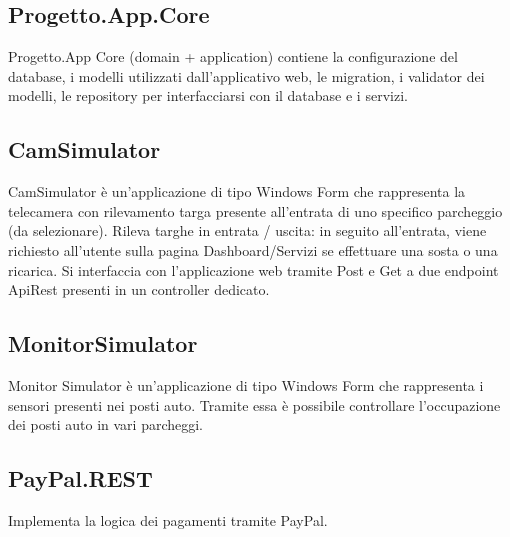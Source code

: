 \documentclass{article}
\begin{document}
\subsection{Progetto.App.Core}
Progetto.App Core (domain + application) contiene la configurazione del database, i modelli utilizzati dall'applicativo web, le migration, i validator dei modelli, le repository per interfacciarsi con il database e i servizi.
\subsection{CamSimulator}
CamSimulator è un'applicazione di tipo Windows Form che rappresenta la telecamera con
rilevamento targa presente all'entrata di uno specifico parcheggio (da selezionare).
Rileva targhe in entrata / uscita: in seguito all'entrata, viene richiesto all'utente sulla pagina Dashboard/Servizi se effettuare una sosta o una ricarica. Si interfaccia con l'applicazione web tramite Post e Get a due endpoint ApiRest presenti in un
controller dedicato.
\subsection{MonitorSimulator}
Monitor Simulator è un'applicazione di tipo Windows Form che rappresenta i sensori presenti nei posti auto. Tramite essa è possibile controllare l'occupazione dei posti auto in vari parcheggi.
\subsection{PayPal.REST}
Implementa la logica dei pagamenti tramite PayPal.
\end{document}
